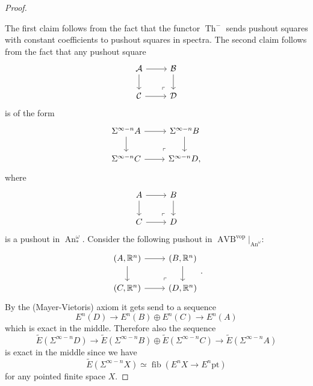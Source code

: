 \documentclass{article}
\newcommand{\R}{\mathbb{R}} %
\newcommand{\pt}{\mathrm{pt}}
\newcommand{\vop}{\mathrm{vop}}
\DeclareMathOperator{\AVB}{AVB}
\DeclareMathOperator{\An}{An}
\DeclareMathOperator*{\fib}{fib}
\DeclareMathOperator{\Th}{Th}
\begin{document}
\begin{proof}
\begin{itemize}
    \end{itemize}
    The first claim follows from the fact that the functor $\Th^-$ sends pushout squares with constant coefficients 
    to pushout squares in spectra. 
    The second claim follows from the fact that any pushout square
    \[\begin{tikzcd}
        {\mathcal A} & {\mathcal B} \\
        {\mathcal C} & {\mathcal D}
        \arrow[from=1-1, to=1-2]
        \arrow[from=1-2, to=2-2]
        \arrow[from=1-1, to=2-1]
        \arrow[from=2-1, to=2-2]
        \arrow["\lrcorner"{anchor=center, pos=0.125, rotate=180}, draw=none, from=2-2, to=1-1]
    \end{tikzcd}\]
     is of the form 
    \[\begin{tikzcd}
        {\Sigma^{\infty - n}A} & {\Sigma^{\infty - n}B} \\
        {\Sigma^{\infty - n}C} & {\Sigma^{\infty - n}D}
        \arrow[from=1-1, to=1-2]
        \arrow[from=1-2, to=2-2]
        \arrow[from=1-1, to=2-1]
        \arrow[from=2-1, to=2-2]
        \arrow["\lrcorner"{anchor=center, pos=0.125, rotate=180}, draw=none, from=2-2, to=1-1],
    \end{tikzcd}\]
    where 
    \[\begin{tikzcd}
        A & B \\
        C & D
        \arrow[from=1-1, to=1-2]
        \arrow[from=1-2, to=2-2]
        \arrow[from=1-1, to=2-1]
        \arrow[from=2-1, to=2-2]
        \arrow["\lrcorner"{anchor=center, pos=0.125, rotate=180}, draw=none, from=2-2, to=1-1]
    \end{tikzcd}\]
    is a pushout in $\An_*^\omega$.
    Consider the following pushout in $\AVB^\vop|_{\An^\omega}$:
    \[\begin{tikzcd}
        {(A,\R^n)} & {(B,\R^n)} \\
        {(C,\R^n)} & {(D,\R^n)}
        \arrow[from=1-1, to=1-2]
        \arrow[from=1-2, to=2-2]
        \arrow[from=1-1, to=2-1]
        \arrow[from=2-1, to=2-2]
        \arrow["\lrcorner"{anchor=center, pos=0.125, rotate=180}, draw=none, from=2-2, to=1-1]
    \end{tikzcd}.\]
    By the (Mayer-Vietoris) axiom it gets send to a sequence 
    \[
    E^n(D) \to E^n(B) \oplus E^n(C) \to E^n(A)    
    \]
    which is exact in the middle. Therefore also the sequence 
    \[
    \tilde E(\Sigma^{\infty - n} D) \to \tilde E(\Sigma^{\infty - n} B) \oplus \tilde E(\Sigma^{\infty - n} C)  \to \tilde E(\Sigma^{\infty - n} A)     
    \]
    is exact in the middle since we have 
    \[
    \tilde E(\Sigma^{\infty -n} X) \simeq \fib( E^n X \to E^n \pt)
    \]
    for any pointed finite space $X$.
\end{proof}
\end{document}
